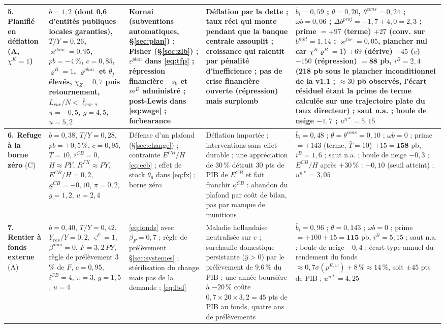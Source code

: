 \documentclass[11pt,a4paper]{article}
\begin{document}
\begin{center}
\begin{longtable}{p{1.6cm}p{3.1cm}p{3.4cm}p{2.9cm}p{3.5cm}}
\textbf{5. Planifié en déflation} (A, $\chi^K=1$) & $b=1{,}2$ (dont 0,6 d'entités publiques locales garanties), $T/Y=0{,}26$, $\varkappa^{dom}=0{,}95$, $pb=-4\,\%$, $c=0{,}85$, $\varrho^B=1$, $\varrho^{plan}$ et $\theta_j$ élevés, $\chi_Z=0{,}7$ puis retournement, $L_{rur}/N<\bar\ell_{rur}$, $\pi=-0{,}5$, $g=4{,}5$, $u=5{,}2$ & Kornai (subventions automatiques, \S\ref{sec:plan}) ; Fisher (\S\ref{sec:zlb}) ; $\varepsilon^{plan}$ dans \eqref{eq:tfp} ; répression financière $-s_9$ et $m^D$ administré ; post-Lewis dans \eqref{eq:wage} ; forbearance & Déflation par la dette ; taux réel qui monte pendant que la banque centrale assouplit ; croissance qui ralentit par pénalité d'inefficience ; pas de crise financière ouverte (répression) mais surplomb & $\bar b_i=0{,}59$ ; $\theta=0{,}20$, $\theta^{cons}=0{,}24$ ; $\omega b=0{,}06$ ; $\Delta b^{proj}=-1{,}7+4{,}0=2{,}3$ ; prime $=+97$ (terme) $+27$ (conv. sur $b^{mkt}=1{,}14$ ; $\varkappa^{for}=0{,}05$, plancher nul car $\chi^K\varrho^B=1$) $+69$ (dérive) $+45$ ($c$) $-150$ (répression) $=\mathbf{88}$ pb, $i^B=2{,}4$ (218 pb sous le plancher inconditionnel de la v1.1 ; $\approx30$ pb observés, l'écart résiduel étant la prime de terme calculée sur une trajectoire plate du taux directeur) ; saut n.a. ; boule de neige $-1{,}7$ ; $u^{n\ast}=5{,}15$\\
\midrule
\textbf{6. Refuge à la borne zéro} (C) & $b=0{,}38$, $T/Y=0{,}28$, $pb=+0{,}5\,\%$, $c=0{,}95$, $\bar T=10$, $i^{CB}=0$, $H\approx PY$, $R^{FX}\approx PY$, $E^{CB}/H=0{,}2$, $\underline\kappa^{CB}=-0{,}10$, $\pi=0{,}2$, $g=1{,}2$, $u=2{,}4$ & Défense d'un plafond (\S\ref{sec:change}) ; contrainte $E^{CB}/H$ \eqref{eq:ecb} ; effet de stock $\theta_6$ dans \eqref{eq:fx} ; borne zéro & Déflation importée ; interventions sans effet durable ; une appréciation de 30\,\% détruit 30 pts de PIB de $E^{CB}$ et fait franchir $\underline\kappa^{CB}$ : abandon du plafond par coût de bilan, pas par manque de munitions & $\bar b_i=0{,}48$ ; $\theta=\theta^{cons}=0{,}10$ ; $\omega b=0$ ; prime $=+143$ (terme, $\bar T=10$) $+15=\mathbf{158}$ pb, $i^B=1{,}6$ ; saut n.a. ; boule de neige $-0{,}3$ ; $E^{CB}/H$ après $+30\,\%$ : $-0{,}10$ (seuil atteint) ; $u^{n\ast}=3{,}05$\\
\midrule
\textbf{7. Rentier à fonds externe} (A) & $b=0{,}40$, $T/Y=0{,}42$, $Y_{res}/Y=0{,}2$, $\varsigma^F=1$, $\beta^{dom}=0$, $F=3{,}2\,PY$, règle de prélèvement 3\,\% de $F$, $c=0{,}95$, $i^{CB}=4$, $\pi=3$, $g=1{,}5$, $u=4$ & \eqref{eq:fonds} avec $\beta_F=0{,}7$ ; règle de prélèvement \S\ref{sec:systemes} ; stérilisation du change mais pas de la demande ; \eqref{eq:lbd} & Maladie hollandaise neutralisée sur $e$ ; surchauffe domestique persistante ($\hat y>0$) par le prélèvement de 9,6\,\% du PIB ; une année boursière à $-20\,\%$ coûte $0{,}7\times20\times3{,}2=45$ pts de PIB au fonds, quatre ans de prélèvements & $\bar b_i=0{,}96$ ; $\theta=0{,}143$ ; $\omega b=0$ ; prime $=+100+15=\mathbf{115}$ pb, $i^B=5{,}15$ ; saut n.a. ; boule de neige $-0{,}4$ ; écart-type annuel du rendement du fonds $\approx0{,}7\sigma(p^{E,w})+8\,\%\approx14\,\%$, soit $\pm45$ pts de PIB ; $u^{n\ast}=4{,}25$\\

\end{longtable}
\end{center}
\end{document}
